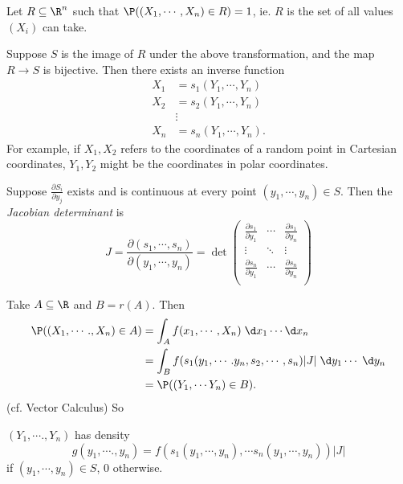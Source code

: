 \documentclass[a4paper]{article}
\begin{document}
Let $R\subseteq \R^n$ such that $\P((X_1, \cdots, X_n)\in R) = 1$, ie. $R$ is the set of all values $(X_i)$ can take.

Suppose $S$ is the image of $R$ under the above transformation, and the map $R\to S$ is bijective. Then there exists an inverse function
\begin{align*}
  X_1 &= s_1(Y_1, \cdots, Y_n)\\
  X_2 &= s_2(Y_1, \cdots, Y_n)\\
  &\vdots\\
  X_n &= s_n(Y_1, \cdots, Y_n).
\end{align*}
For example, if $X_1, X_2$ refers to the coordinates of a random point in Cartesian coordinates, $Y_1, Y_2$ might be the coordinates in polar coordinates.

\begin{defi}
  Suppose $\frac{\partial S_i}{\partial y_j}$ exists and is continuous at every point $(y_1, \cdots, y_n)\in S$. Then the \emph{Jacobian determinant} is
  \[
    J = \frac{\partial (s_1, \cdots, s_n)}{\partial (y_1, \cdots, y_n)} = 
    \det
    \begin{pmatrix}
      \frac{\partial s_1}{\partial y_1} & \cdots & \frac{\partial s_1}{\partial y_n}\\
      \vdots & \ddots & \vdots\\
      \frac{\partial s_n}{\partial y_1} & \cdots & \frac{\partial s_n}{\partial y_n}\\
    \end{pmatrix}
  \]
\end{defi}
Take $A\subseteq \R$ and $B = r(A)$. Then
\begin{align*}
  \P((X_1, \cdots., X_n)\in A) &= \int_A f(x_1, \cdots, X_n) \;\d x_1\cdots \d x_n\\
  &= \int_B f(s_1(y_1, \cdots. y_n, s_2, \cdots, s_n) |J|\;\d y_1\cdots \;\d y_n\\
  &= \P((Y_1, \cdots Y_n)\in B).
\end{align*}
(cf. Vector Calculus) So
\begin{prop}
  $(Y_1, \cdots., Y_n)$ has density
  \[
    g(y_1, \cdots., y_n) = f(s_1(y_1, \cdots, y_n), \cdots s_n(y_1, \cdots, y_n))|J|
  \]
  if $(y_1,  \cdots, y_n)\in S$, $0$ otherwise. 
\end{prop}
\end{document}
